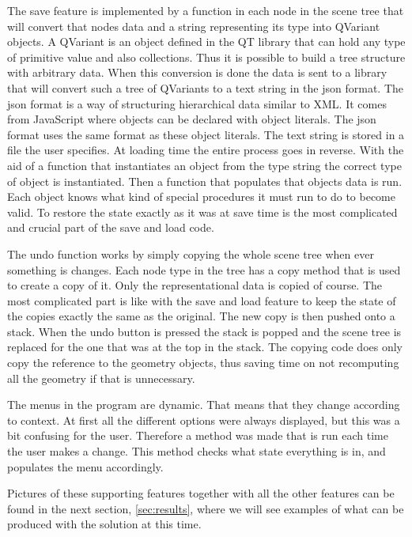 \documentclass[a4paper,12pt]{report}
\newcommand{\secref}[1]{\autoref{#1}}
\begin{document}
The save feature is implemented by a function in each node in the scene tree that will convert that nodes data and a string representing its type into QVariant objects. A QVariant is an object defined in the QT library that can hold any type of primitive value and also collections. Thus it is possible to build a tree structure with arbitrary data. When this conversion is done the data is sent to a library that will convert such a tree of QVariants to a text string in the json format. The json format is a way of structuring hierarchical data similar to XML. It comes from JavaScript where objects can be declared with object literals. The json format uses the same format as these object literals. The text string is stored in a file the user specifies. At loading time the entire process goes in reverse. With the aid of a function that instantiates an object from the type string the correct type of object is instantiated. Then a function that populates that objects data is run. Each object knows what kind of 
special procedures it must run to do to become valid. To restore the state exactly as it was at save time is the most complicated and crucial part of the save and load code.

The undo function works by simply copying the whole scene tree when ever something is changes. Each node type in the tree has a copy method that is used to create a copy of it. Only the representational data is copied of course. The most complicated part is like with the save and load feature to keep the state of the copies exactly the same as the original. The new copy is then pushed onto a stack. When the undo button is pressed the stack is popped and the scene tree is replaced for the one that was at the top in the stack. The copying code does only copy the reference to the geometry objects, thus saving time on not recomputing all the geometry if that is unnecessary.

The menus in the program are dynamic. That means that they change according to context. At first all the different options were always displayed, but this was a bit confusing for the user. Therefore a method was made that is run each time the user makes a change. This method checks what state everything is in, and populates the menu accordingly.

Pictures of these supporting features together with all the other features can be found in the next section, \secref{sec:results}, where we will see examples of what can be produced with the solution at this time.

\clearpage
\end{document}
